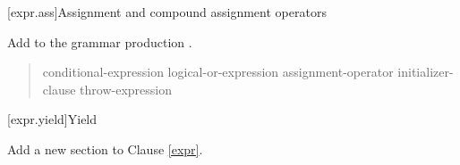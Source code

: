 %	
%

\setcounter{section}{17}
[expr.ass]{Assignment and compound assignment operators}%

Add  to the grammar production .

\begin{quote}
\begin{bnf}
  \br
  conditional-expression\br
  logical-or-expression assignment-operator initializer-clause\br
  throw-expression \br
\end{bnf}
\end{quote}

\setcounter{section}{20}
[expr.yield]{Yield}%

Add a new section to Clause \ref{expr}.

